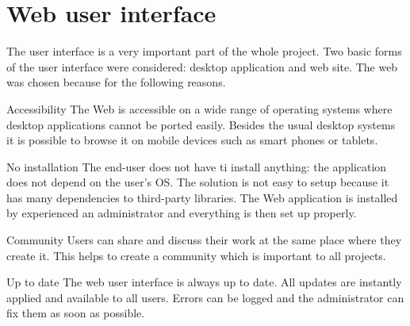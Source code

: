 
\section{Web user interface}
\label{sec:design-web}

The user interface is a very important part of the whole project.
Two basic forms of the user interface were considered: desktop application and web site.
The web was chosen because for the following reasons.

\begin{description*}
	\item[Accessibility]
		The Web is accessible on a wide range of operating systems where desktop applications cannot be ported easily.
		Besides the usual desktop systems it is possible to browse it on mobile devices such as smart phones or tablets.		
	\item[No installation]
		The end-user does not have ti install anything: the application does not depend on the user's OS. 
		The solution is not easy to setup because it has many dependencies to third-party libraries.
		The Web application is installed by experienced an administrator and everything is then set up properly.
	\item[Community]
		Users can share and discuss their work at the same place where they create it.
		This helps to create a community which is important to all projects.
	\item[Up to date]
		The web user interface is always up to date.
		All updates are instantly applied and available to all users.
		Errors can be logged and the administrator can fix them as soon as possible.		
\end{description*}

